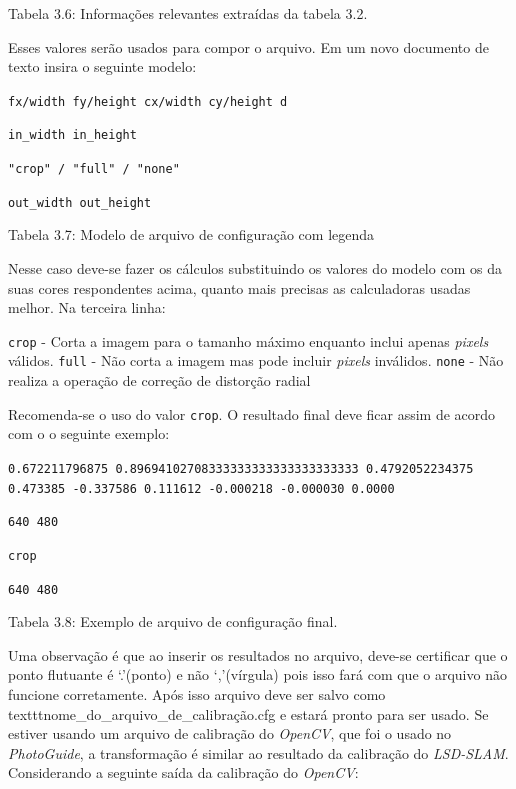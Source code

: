 Tabela 3.6: Informações relevantes extraídas da tabela 3.2.

Esses valores serão usados para compor o arquivo. Em um novo documento de texto insira o seguinte modelo:

{\setlength{\parindent}{0cm}
\texttt{fx/width fy/height cx/width cy/height d}

\texttt{in\_width in\_height}

\texttt{"crop" / "full" / "none"}

\texttt{out\_width out\_height}}

Tabela 3.7: Modelo de arquivo de configuração com legenda

Nesse caso deve-se fazer os cálculos substituindo os valores do modelo com os da suas cores respondentes acima, quanto mais precisas as calculadoras usadas melhor. Na terceira linha:

\texttt{crop} - Corta a imagem para o tamanho máximo enquanto inclui apenas \textit{pixels} válidos.
\texttt{full} - Não corta a imagem mas pode incluir \textit{pixels} inválidos.
\texttt{none} - Não realiza a operação de correção de distorção radial

Recomenda-se o uso do valor \texttt{crop}. O resultado final deve ficar assim de acordo com o o seguinte exemplo:

{\setlength{\parindent}{0cm}
\texttt{0.672211796875 0.89694102708333333333333333333333 0.4792052234375 0.473385 -0.337586 0.111612 -0.000218 -0.000030 0.0000}

\texttt{640 480}

\texttt{crop}

\texttt{640 480}}

Tabela 3.8: Exemplo de arquivo de configuração final.

Uma observação é que ao inserir os resultados no arquivo, deve-se certificar que o ponto flutuante é ‘.’(ponto) e não ‘,’(vírgula) pois isso fará com que o arquivo não funcione corretamente. Após isso arquivo deve ser salvo como texttt{nome\_do\_arquivo\_de\_calibração.cfg} e estará pronto para ser usado. Se estiver usando um arquivo de calibração do \textit{OpenCV}, que foi o usado no \textit{PhotoGuide}, a transformação é similar ao resultado da calibração do \textit{LSD-SLAM}. Considerando a seguinte saída da calibração do \textit{OpenCV}:

